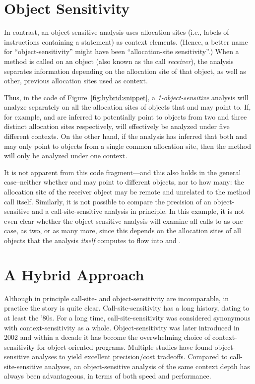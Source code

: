 \section{Object Sensitivity}

In contrast, an object sensitive analysis uses allocation sites (i.e., labels of instructions containing a  statement) as context elements. (Hence, a better name for ``object-sensitivity'' might have been ``allocation-site sensitivity''.) When a method is called on an object (also known as the call \emph{receiver}), the analysis separates information depending on the allocation site of that object, as well as other, previous allocation sites used as context.

Thus, in the code of Figure~\ref{fig:hybrid:snippet}, a \emph{1-object-sensitive} analysis will analyze  separately on all the allocation sites of objects that  and  may point to. If, for example,  and  are inferred to potentially point to objects from two and three distinct allocation sites respectively,  will effectively be analyzed under five different contexts. On the other hand, if the analysis has inferred that both  and  may only point to objects from a single common allocation site, then the method will only be analyzed under one context.

It is not apparent from this code fragment---and this also holds in the general case--neither whether  and  may point to different objects, nor to how many: the allocation site of the receiver object may be remote and unrelated to the method call itself. Similarly, it is not possible to compare the precision of an object-sensitive and a call-site-sensitive analysis in principle. In this example, it is not even clear whether the object sensitive analysis will examine all calls to  as one case, as two, or as many more, since this depends on the allocation sites of all objects that the analysis \emph{itself} computes to flow into  and .

\section{A Hybrid Approach}

Although in principle call-site- and object-sensitivity are incomparable, in practice the story is quite clear. Call-site-sensitivity has a long history, dating to at least the '80s. For a long time, call-site-sensitivity was considered synonymous with context-sensitivity as a whole. Object-sensitivity was later introduced in 2002 \cite{issta:2002:Milanova} and within a decade it has become the overwhelming choice of context-sensitivity for object-oriented programs. Multiple studies \cite{pldi:2006:Naik,paste:2005:Liang,thesis:Lhotak,article:2008:tosem:Lhotak,oopsla:2009:Bravenboer} have found object-sensitive analyses to yield excellent precision/cost tradeoffs. Compared to call-site-sensitive analyses, an object-sensitive analysis of the same context depth has always been advantageous, in terms of both speed and performance.

